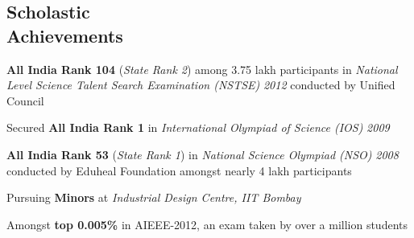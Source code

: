 \documentclass[margin,11pt]{resume}
\begin{document}
\begin{resume}
\vspace{70pt}
    \section{\mysidestyle Scholastic\\Achievements}
   \begin{list2}
\item \textbf{All India Rank 104} (\textsl{State Rank 2}) among 3.75 lakh participants in \textsl{National Level Science Talent Search Examination (NSTSE)} \textsl{2012} conducted by Unified Council
\item Secured \textbf{All India Rank 1} in \textsl{International Olympiad of Science (IOS)} \textsl{2009}
\item \textbf{All India Rank 53} (\textsl{State Rank 1}) in \textsl{National Science Olympiad (NSO)} \textsl{2008} conducted by Eduheal Foundation amongst nearly 4 lakh participants
\item Pursuing \textbf{Minors} at \textsl{Industrial Design Centre, IIT Bombay}
\item Amongst \textbf{top 0.005\%} in AIEEE-2012, an exam taken by over a million students


 \end{list2}

\end{resume}
\end{document}
